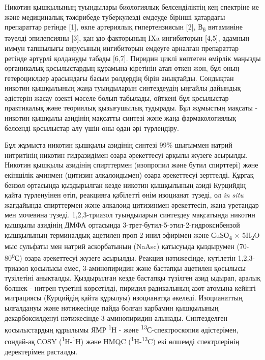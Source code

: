 Никотин қышқылының туындылары биологиялық белсенділіктің кең спектріне
ие және медициналық тәжірибеде туберкулезді емдеуде бірінші қатардағы
препараттар ретінде {[}1{]}, өкпе артериялық гипертензиясын {[}2{]},
В\textsubscript{6} витаминіне тәуелді эпилепсияны {[}3{]}, қан ұю
факторының IXa ингибиторын {[}4,5{]}, адамның иммун тапшылығы вирусының
ингибиторын емдеуге арналған препараттар ретінде әртүрлі қолдануды
табады {[}6,7{]}. Пиридин циклі көптеген өмірлік маңызды органикалық
қосылыстардың құрамына кіретінін атап өткен жөн, бұл оның гетероциклдер
арасындағы басым рөлдердің бірін анықтайды. Сондықтан никотин қышқылының
жаңа туындыларын синтездеудің ыңғайлы дайындық әдістерін жасау өзекті
мәселе болып табылады, өйткені бұл қосылыстар практикалық және теориялық
қызығушылық тудырады. Бұл жұмыстың мақсаты - никотин қышқылы азидінің
мақсатты синтезі және жаңа фармакологиялық белсенді қосылыстар алу үшін
оны одан әрі түрлендіру.

Бұл жұмыста никотин қышқылы азидінің синтезі 99\% шығыммен натрий
нитритінің никотин гидразидімен өзара әрекеттесуі арқылы жүзеге
асырылды. Никотин қышқылы азидінің спирттермен (изопропил және бутил
спирттері) және екіншілік аминмен (цитизин алкалоидымен) өзара
әрекеттесуі зерттелді. Құрғақ бензол ортасында қыздырылған кезде никотин
қышқылының азиді Курцийдің қайта түрленуінен өтіп, реакцияға қабілетті
өнім изоцианат түзеді, ол \emph{in situ} жағдайында спирттермен және
алкалоид цитизинмен әрекеттесіп, жаңа уретандар мен мочевина түзеді.
1,2,3-триазол туындыларын синтездеу мақсатында никотин қышқылы азидінің
ДМФА ортасында 3-трет-бутил-5-этил-2-гидроксибензой қышқылының
терминалдық ацетилен-проп-2-инил эфирімен және
СuЅО\textsubscript{4} × 5H\textsubscript{2}O мыс сульфаты мен натрий
аскорбатының (NaAsc) қатысуыда қыздырумен (70-80\textsuperscript{о}С)
өзара әрекеттесуі жүзеге асырылды. Реакция нәтижесінде, күтілетін
1,2,3-триазол қосылысы емес, 3-аминопиридин және бастапқы ацетилен
қосылысы түзілетіні анықталды. Қыздырылған кезде бастапқы түзілген азид
ыдырап, аралық бөлшек - нитрен түзетіні көрсетілді, пиридил радикалының
азот атомына кейінгі миграциясы (Курцийдің қайта құрылуы) изоцианатқа
әкеледі. Изоцианаттың ылғалдануы және нәтижесінде пайда болған карбамин
қышқылының декарбоксилденуі нәтижесінде 3-аминопиридин алынады.
Синтезделген қосылыстардың құрылымы ЯМР \textsuperscript{1}Н - және
\textsuperscript{13}С-спектроскопия әдістерімен, сондай-ақ СOSY
(\textsuperscript{1}H-\textsuperscript{1}H) және HMQC
(\textsuperscript{1}H-\textsuperscript{13}C) екі өлшемді спектрлерінің
деректерімен расталды.

